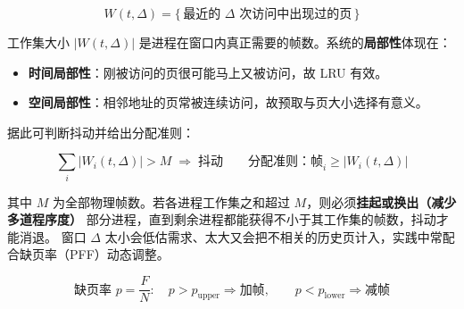 \begin{equation}
    W(t,\Delta) = \{\, \text{最近的 } \Delta \text{ 次访问中出现过的页} \,\}
\end{equation}

工作集大小 $|W(t,\Delta)|$ 是进程在窗口内真正需要的帧数。系统的\textbf{局部性}体现在：

\begin{itemize}
    \item \textbf{时间局部性}：刚被访问的页很可能马上又被访问，故 LRU 有效。
    \item \textbf{空间局部性}：相邻地址的页常被连续访问，故预取与页大小选择有意义。
\end{itemize}

据此可判断抖动并给出分配准则：

\begin{equation}
    \sum_{i} |W_i(t,\Delta)| > M \;\Longrightarrow\; \text{抖动}
    \qquad
    \text{分配准则：帧}_i \ge |W_i(t,\Delta)|
\end{equation}

其中 $M$ 为全部物理帧数。若各进程工作集之和超过 $M$，则必须\textbf{挂起或换出（减少多道程序度）}
部分进程，直到剩余进程都能获得不小于其工作集的帧数，抖动才能消退。
窗口 $\Delta$ 太小会低估需求、太大又会把不相关的历史页计入，实践中常配合缺页率（PFF）动态调整。

\begin{equation}
    \text{缺页率 } p = \frac{F}{N}:
    \quad p > p_{\text{upper}} \Rightarrow \text{加帧},\qquad
    p < p_{\text{lower}} \Rightarrow \text{减帧}
\end{equation}
